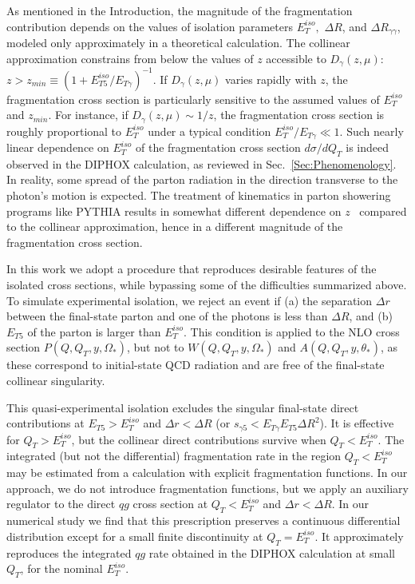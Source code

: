 \documentclass[12pt,english,aps,preprint,prd,letterpaper,fleqn,nofootinbib,showpacs,showkeys,tightenlines,floatfix]{revtex4}
\begin{document}
As mentioned in the Introduction, the magnitude of the fragmentation
contribution depends on the values of isolation parameters $E_{T}^{iso},$
$\Delta R$, and $\Delta R_{\gamma\gamma}$, modeled only approximately
in a theoretical calculation. The collinear approximation constrains
from below the values of $z$ accessible to $D_{\gamma}(z,\mu)$:
$z>z_{min}\equiv(1+E_{T5}^{iso}/E_{T\gamma})^{-1}$. 
If $D_{\gamma}(z,\mu)$ varies rapidly with $z$, 
the fragmentation cross section is particularly sensitive to the
assumed values of $E_{T}^{iso}$ and $z_{min}$. 
For instance, if $D_{\gamma}(z,\mu)\sim1/z$,
the fragmentation cross section is roughly proportional to $E_{T}^{iso}$
under a typical condition $E_{T}^{iso}/E_{T\gamma}\ll1$. Such nearly
linear dependence on $E_{T}^{iso}$ of the fragmentation cross section 
$d\sigma/dQ_{T}$ is indeed observed in the DIPHOX calculation, as reviewed
in Sec.~\ref{Sec:Phenomenology}. In reality, some spread of the
parton radiation in the direction transverse to the photon's motion
is expected. The treatment of kinematics in parton showering programs
like PYTHIA results in somewhat different dependence on $z$~\cite{Balazs:1997hv}
compared to the collinear approximation, hence in a different magnitude
of the fragmentation cross section.

In this work we adopt a procedure that reproduces desirable features
of the isolated cross sections, while bypassing some of the difficulties
summarized above. To simulate experimental isolation, we reject an
event if (a) the separation $\Delta r$ between the final-state parton
and one of the photons is less than $\Delta R$, and (b) $E_{T5}$
of the parton is larger than $E_{T}^{iso}$. This condition is applied
to the NLO cross section $P(Q,Q_{T},y,\Omega_{*})$, but not to
$W(Q,Q_{T},y,\Omega_{*})$ and $A(Q,Q_{T},y,\theta_{*})$,
as these correspond to initial-state QCD radiation and are free of 
the final-state collinear singularity.

This quasi-experimental isolation excludes the singular final-state
direct contributions at $E_{T5}>E_{T}^{iso}$ and $\Delta r<\Delta R$
(or $s_{\gamma5}<E_{T\gamma}E_{T5}\Delta R^{2}$). It is effective
for $Q_{T}>E_{T}^{iso}$, but the collinear direct contributions survive
when $Q_{T}<E_{T}^{iso}$. The integrated (but not the differential)
fragmentation rate in the region $Q_{T}<E_{T}^{iso}$ may be estimated
from a calculation with explicit fragmentation functions. In our approach, 
we do not introduce
fragmentation functions, but we apply an auxiliary regulator to the direct
$qg$ cross section at $Q_{T}<E_{T}^{iso}$ and $\Delta r<\Delta R$.
In our numerical study we find that this prescription preserves a
continuous differential distribution except for a small finite discontinuity 
at $Q_{T} = E_{T}^{iso}$.  It approximately reproduces
the integrated $qg$ rate obtained in the DIPHOX calculation at small
$Q_{T}$, for the nominal $E_{T}^{iso}$.
\end{document}
